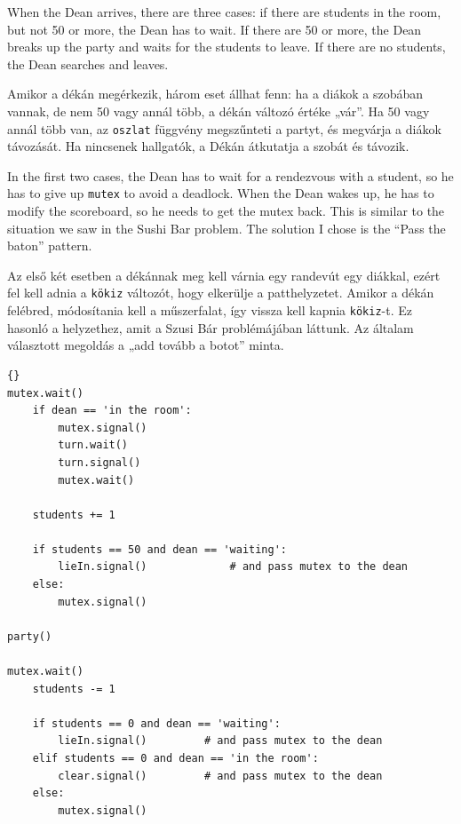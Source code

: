 \documentclass{book}
\begin{document}
When the Dean arrives, there are three cases: if there are students in
the room, but not 50 or more, the Dean has to wait.  If there are 50
or more, the Dean breaks up the party and waits for the students to
leave.  If there are no students, the Dean searches and leaves.

Amikor a dékán megérkezik, három eset állhat fenn: ha a diákok a szobában vannak, de nem
50 vagy annál több, a dékán változó értéke „vár”. Ha 50 vagy annál több van, az {\tt oszlat}
függvény megszűnteti a partyt, és megvárja a diákok távozását. Ha nincsenek hallgatók, a
Dékán átkutatja a szobát és távozik.

In the first two cases, the Dean has to wait for a rendezvous with a
student, so he has to give up {\tt mutex} to avoid a deadlock.  When
the Dean wakes up, he has to modify the scoreboard, so he needs to get
the mutex back.  This is similar to the situation we saw in the Sushi
Bar problem.  The solution I chose is the ``Pass the baton'' pattern.

Az első két esetben a dékánnak meg kell várnia egy randevút egy diákkal, ezért fel kell adnia
a {\tt kökiz} változót, hogy elkerülje a patthelyzetet. Amikor a dékán felébred, módosítania kell
a műszerfalat, így vissza kell kapnia {\tt kökiz}-t. Ez hasonló a helyzethez, amit a
Szusi Bár problémájában láttunk. Az általam választott megoldás a „add tovább a botot” minta.

\newpage
\begin{lstlisting}[title={Room party solution (student)}]{}
mutex.wait()
    if dean == 'in the room':
        mutex.signal()
        turn.wait()
        turn.signal()
        mutex.wait()

    students += 1

    if students == 50 and dean == 'waiting':
        lieIn.signal()             # and pass mutex to the dean
    else:
        mutex.signal()

party()

mutex.wait()
    students -= 1

    if students == 0 and dean == 'waiting':
        lieIn.signal()         # and pass mutex to the dean
    elif students == 0 and dean == 'in the room':
        clear.signal()         # and pass mutex to the dean
    else:
        mutex.signal()
\end{lstlisting}
\end{document}
